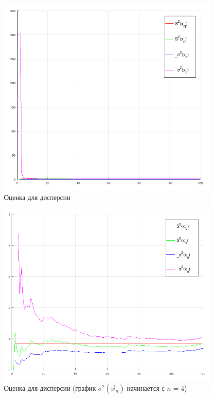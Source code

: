 \begin{figure}[H]
	\begin{center}
		\includegraphics[scale=0.5]{assets/S2_1.png}
	\end{center}
	\caption{Оценка для дисперсии}
\end{figure}

\begin{figure}[H]
	\begin{center}
		\includegraphics[scale=0.46]{assets/S2_2.png}
	\end{center}
	\caption{Оценка для дисперсии (график $\overline \sigma^2(\vec x_n)$ начинается с $n$ = 4)}
\end{figure}